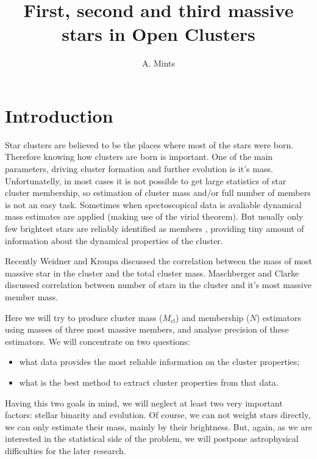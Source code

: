 \documentclass[a4paper,10pt]{article}
\title{First, second and third massive stars in Open Clusters}
\author{A. Mints}
\newcommand{\Mcl}{M_{\mathrm{cl}}}
\begin{document}
\maketitle

\begin{abstract}

\end{abstract}

\section{Introduction}
Star clusters are believed to be the places where most of the stars were born.
Therefore knowing how clusters are born is important. One of the main parameters, driving cluster formation and further evolution is it's mass. Unfortunatelly, in most cases it is not possible to get large statistics of star cluster membership,
so estimation of cluster mass and/or full number of members is not an easy task. Sometimes when spectoscopical data is avaliable dynamical mass estimates are applied (making use of the virial theorem). But usually only few brightest
stars are reliably identified as members \cite{Piskunov2008}, providing tiny amount of information about the dynamical properties of the cluster.

Recently Weidner and Kroupa \cite{Origin} discussed the correlation between the mass of most massive star in the cluster and the total cluster mass. Maschberger and Clarke \cite{MassFromN} discussed correlation between number of stars in the cluster and it's most massive member mass.

Here we will try to produce cluster mass ($\Mcl$) and membership ($N$) estimators using masses of three most massive members,
and analyse precision of these estimators. We will concentrate on two questions: 
\begin{itemize}
 \item what data provides the most reliable information on the cluster properties;
 \item what is the best method to extract cluster properties from that data.
\end{itemize}

Having this two goals in mind, we will neglect at least two very important factors: stellar binarity and evolution.
Of course, we can not weight stars directly, we can only estimate their mass, mainly by their brightness. 
But, again, as we are interested in the statistical side of the problem, we will postpone astrophysical
difficulties for the later research.
\end{document}
